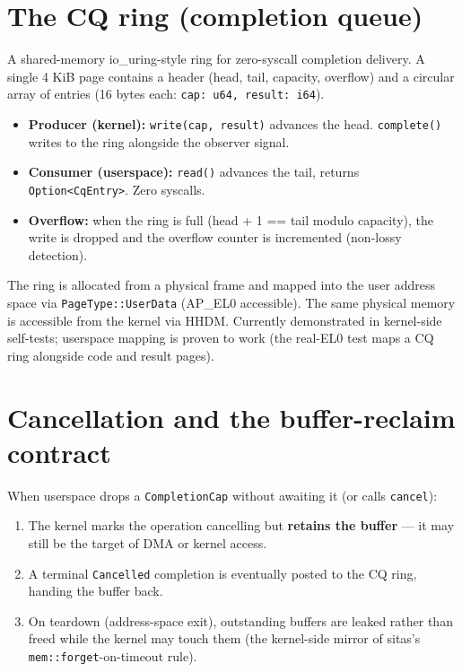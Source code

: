 \section{The CQ ring (completion queue)}

A shared-memory io\_uring-style ring for zero-syscall completion delivery. A
single 4 KiB page contains a header (head, tail, capacity, overflow) and a
circular array of entries (16 bytes each: \texttt{cap: u64, result: i64}).

\begin{itemize}
    \item \textbf{Producer (kernel):} \texttt{write(cap, result)} advances the
        head. \texttt{complete()} writes to the ring alongside the observer
        signal.
    \item \textbf{Consumer (userspace):} \texttt{read()} advances the tail,
        returns \texttt{Option<CqEntry>}. Zero syscalls.
    \item \textbf{Overflow:} when the ring is full (head + 1 == tail modulo
        capacity), the write is dropped and the overflow counter is
        incremented (non-lossy detection).
\end{itemize}

The ring is allocated from a physical frame and mapped into the user address
space via \texttt{PageType::UserData} (AP\_EL0 accessible). The same physical
memory is accessible from the kernel via HHDM. Currently demonstrated in
kernel-side self-tests; userspace mapping is proven to work (the real-EL0
test maps a CQ ring alongside code and result pages).

\section{Cancellation and the buffer-reclaim contract}

When userspace drops a \texttt{CompletionCap} without awaiting it (or calls
\texttt{cancel}):
\begin{enumerate}
    \item The kernel marks the operation cancelling but \textbf{retains the
        buffer} --- it may still be the target of DMA or kernel access.
    \item A terminal \texttt{Cancelled} completion is eventually posted to
        the CQ ring, handing the buffer back.
    \item On teardown (address-space exit), outstanding buffers are leaked
        rather than freed while the kernel may touch them (the kernel-side
        mirror of sitas's \texttt{mem::forget}-on-timeout rule).
\end{enumerate}

